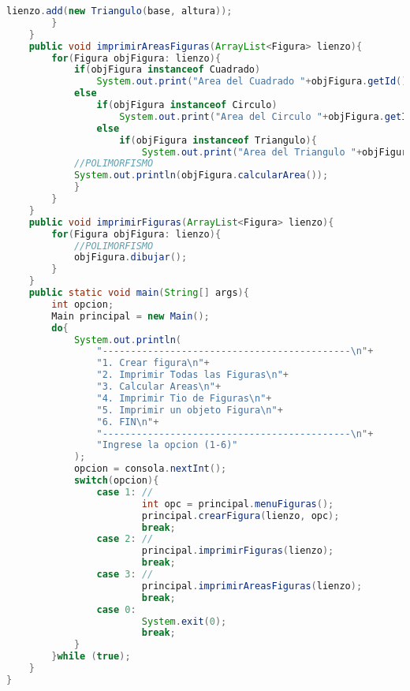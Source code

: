 \documentclass{article}
\begin{document}
\begin{itemize}
\begin{itemize}
\begin{lstlisting}[language=java]
            lienzo.add(new Triangulo(base, altura));
        }
    }
    public void imprimirAreasFiguras(ArrayList<Figura> lienzo){
        for(Figura objFigura: lienzo){
            if(objFigura instanceof Cuadrado)
                System.out.print("Area del Cuadrado "+objFigura.getId()+" : ");
            else 
                if(objFigura instanceof Circulo)
                    System.out.print("Area del Circulo "+objFigura.getId()+" : ");
                else 
                    if(objFigura instanceof Triangulo){
                        System.out.print("Area del Triangulo "+objFigura.getId()+" : ");
            //POLIMORFISMO
            System.out.println(objFigura.calcularArea());
            }
        }
    }
    public void imprimirFiguras(ArrayList<Figura> lienzo){
        for(Figura objFigura: lienzo){
            //POLIMORFISMO
            objFigura.dibujar();
        }
    }
    public static void main(String[] args){
        int opcion;
        Main principal = new Main();
        do{
            System.out.println(
                "--------------------------------------------\n"+
                "1. Crear figura\n"+
                "2. Imprimir Todas las Figuras\n"+
                "3. Calcular Areas\n"+
                "4. Imprimir Tio de Figuras\n"+ 
                "5. Imprimir un objeto Figura\n"+
                "6. FIN\n"+
                "--------------------------------------------\n"+
                "Ingrese la opcion (1-6)"
            );
            opcion = consola.nextInt();
            switch(opcion){
                case 1: //
                        int opc = principal.menuFiguras();
                        principal.crearFigura(lienzo, opc);
                        break;
                case 2: //
                        principal.imprimirFiguras(lienzo);
                        break;
                case 3: //
                        principal.imprimirAreasFiguras(lienzo);
                        break;        
                case 0:
                        System.exit(0);
                        break;    
            }
        }while (true);
    }
}



\end{lstlisting}
\end{itemize}
\end{itemize}
\end{document}
